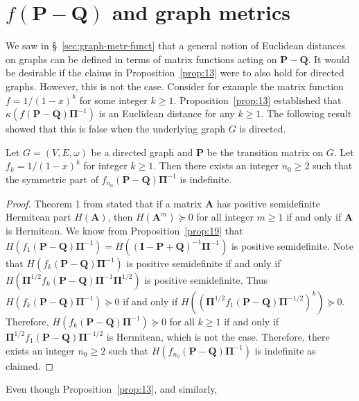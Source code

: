 \section{$f(\mathbf{P} - \mathbf{Q})$ and graph metrics} \label{sec:fmathbfp-mathbfq-gra} We saw in
\S~\ref{sec:graph-metr-funct} that a general notion of Euclidean distances on graphs can be defined in terms of matrix
functions acting on $\mathbf{P} - \mathbf{Q}$. It would be desirable if the claims in Proposition~\ref{prop:13} were to
also hold for directed graphs. However, this is not the case. Consider for example the matrix function $f = 1/(1-x)^{k}$
for some integer $k \geq 1$. Proposition~\ref{prop:13} established that $\kappa(f(\mathbf{P} -
\mathbf{Q})\bm{\Pi}^{-1})$ is an Euclidean distance for any $k \geq 1$.  The following result showed that this is false
when the underlying graph $G$ is directed.  \begin{proposition} \label{prop:25} Let $G = (V,E,\omega)$ be a directed
  graph and $\mathbf{P}$ be the transition matrix on $G$. Let $f_k = 1/(1-x)^{k}$ for integer $k \geq 1$. Then there
  exists an integer $n_0 \geq 2$ such that the symmetric part of $f_{n_0}(\mathbf{P} - \mathbf{Q})\bm{\Pi}^{-1}$ is
  indefinite.  \end{proposition} \begin{proof} Theorem 1 from \citet{johnson75:_power_matric_posit_defin_real_part}
  stated that if a matrix $\mathbf{A}$ has positive semidefinite Hermitean part $H(\mathbf{A})$, then
  $H(\mathbf{A}^{m}) \succeq 0$ for all integer $m \geq 1$ if and only if $\mathbf{A}$ is Hermitean. We know from
  Proposition~\ref{prop:19} that $H(f_1(\mathbf{P} - \mathbf{Q})\bm{\Pi}^{-1}) = H((\mathbf{I} - \mathbf{P} +
  \mathbf{Q})^{-1}\bm{\Pi}^{-1})$ is positive semidefinite. Note that $H(f_{k}(\mathbf{P} - \mathbf{Q})\bm{\Pi}^{-1})$
  is positive semidefinite if and only if $H(\bm{\Pi}^{1/2}f_{k}(\mathbf{P} - \mathbf{Q}) \bm{\Pi}^{-1}
  \bm{\Pi}^{1/2})$ is positive semidefinite. Thus $H(f_{k}(\mathbf{P} - \mathbf{Q})\bm{\Pi}^{-1}) \succeq 0$ if and
  only if $H((\bm{\Pi}^{1/2}f_{1}(\mathbf{P} - \mathbf{Q})\bm{\Pi}^{-1/2})^{k}) \succeq 0$. Therefore,
  $H(f_{k}(\mathbf{P} - \mathbf{Q})\bm{\Pi}^{-1}) \succeq 0$ for all $k \geq 1$ if and only if
  $\bm{\Pi}^{1/2}f_{1}(\mathbf{P} - \mathbf{Q})\bm{\Pi}^{-1/2}$ is Hermitean, which is not the case. Therefore, there
  exists an integer $n_0 \geq 2$ such that $H(f_{n_0}(\mathbf{P} - \mathbf{Q})\bm{\Pi}^{-1})$ is indefinite as
  claimed.  \end{proof}
% 
% 
Even though Proposition~\ref{prop:13}, and similarly,
